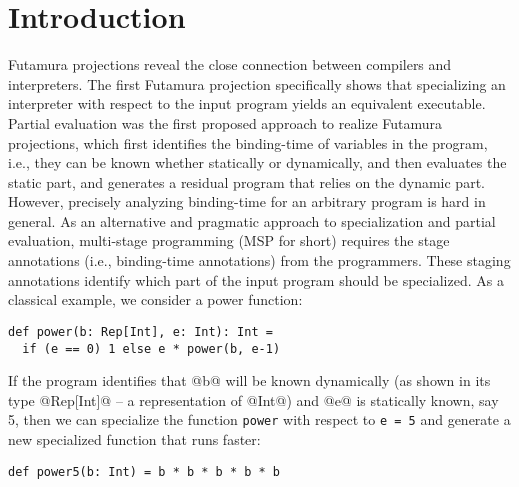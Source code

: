 \section{Introduction}


Futamura projections \cite{Futamura1999, futamura1971partial} reveal the close connection between 
compilers and interpreters. 
The first Futamura projection specifically shows that specializing an interpreter with respect to 
the input program yields an equivalent executable.
Partial evaluation \cite{DBLP:books/daglib/0072559} was the first proposed approach to realize 
Futamura projections, which first identifies the binding-time of variables in the program, i.e., 
they can be known whether statically or dynamically, and then evaluates the static part, and 
generates a residual program that relies on the dynamic part.
However, precisely analyzing binding-time for an arbitrary program is hard in general. As an 
alternative and pragmatic approach to specialization and partial evaluation, multi-stage 
programming (MSP for short) \cite{taha1999multi, DBLP:conf/pepm/TahaS97} requires the stage 
annotations (i.e., binding-time annotations) from the programmers. These staging annotations 
identify which part of the input program should be specialized.
As a classical example, we consider a power function: 
\begin{lstlisting}
def power(b: Rep[Int], e: Int): Int = 
  if (e == 0) 1 else e * power(b, e-1)
\end{lstlisting}
If the program identifies that @b@ will be known dynamically (as shown in its type @Rep[Int]@ -- a representation of @Int@) 
and @e@ is statically known, say 5, 
then we can specialize the function \texttt{power} with respect to \texttt{e = 5} and generate a new 
specialized function that runs faster:
\begin{lstlisting}
def power5(b: Int) = b * b * b * b * b
\end{lstlisting}

